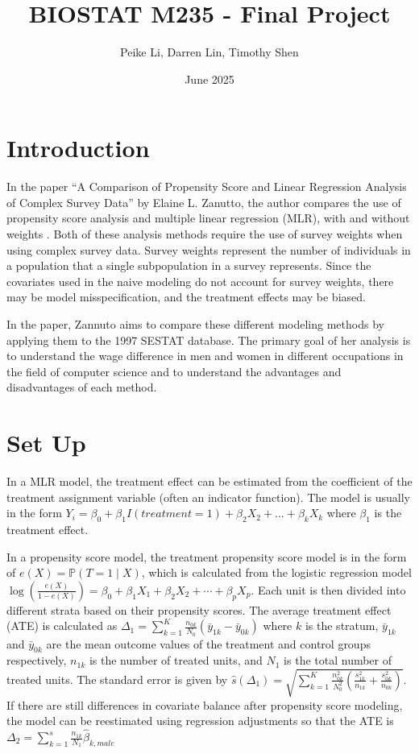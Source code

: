 \documentclass[12pt]{article}
\title{BIOSTAT M235 - Final Project}
\author{Peike Li, Darren Lin, Timothy Shen}
\date{June 2025}
\begin{document}
\doublespacing


\maketitle

\newpage

\section{Introduction} \label{sec:intro}

In the paper “A Comparison of Propensity Score and Linear Regression Analysis of Complex Survey Data” by Elaine L. Zanutto, the author compares the use of propensity score analysis and multiple linear regression (MLR), with and without weights \cite{zanutto_2022}. Both of these analysis methods require the use of survey weights when using complex survey data. Survey weights represent the number of individuals in a population that a single subpopulation in a survey represents. Since the covariates used in the naive modeling do not account for survey weights, there may be model misspecification, and the treatment effects may be biased.

In the paper, Zannuto aims to compare these different modeling methods by applying them to the 1997 SESTAT database. The primary goal of her analysis is to understand the wage difference in men and women in different occupations in the field of computer science and to understand the advantages and disadvantages of each method.


\section{Set Up} \label{sec:setup}

In a MLR model, the treatment effect can be estimated from the coefficient of the treatment assignment variable (often an indicator function). The model is usually in the form $Y_i = \beta_0 + \beta_1 I(treatment = 1) + \beta_2 X_2 + ... + \beta_k X_k$ where $\beta_1$ is the treatment effect.

In a propensity score model, the treatment propensity score model is in the form of $e(X) = \mathbb{P}(T = 1 \mid X)$, which is calculated from the logistic regression model $\log\left( \frac{e(X)}{1 - e(X)} \right) = \beta_0 + \beta_1 X_1 + \beta_2 X_2 + \cdots + \beta_p X_p$. Each unit is then divided into different strata based on their propensity scores. The average treatment effect (ATE) is calculated as $ \Delta_1 = \sum_{k=1}^K \frac{n_{0k}}{N_0}(\bar{y}_{1k} - \bar{y}_{0k})$ where $k$ is the stratum, $\bar{y}_{1k}$ and $\bar{y}_{0k}$ are the mean outcome values of the treatment and control groups respectively, $n_{1k}$ is the number of treated units, and $N_1$ is the total number of treated units. The standard error is given by $\hat{s}(\Delta_1) = \sqrt{\sum_{k=1}^K \frac{n_{0k}^2}{N_0^2} (\frac{s^2_{1k}}{n_{1k}} + \frac{s^2_{0k}}{n_{0k}})}$. If there are still differences in covariate balance after propensity score modeling, the model can be reestimated using regression adjustments so that the ATE is $\Delta_2 = \sum_{k=1}^s \frac{n_{1k}}{N_1} \hat{\beta}_{k,male}$ 
\end{document}
